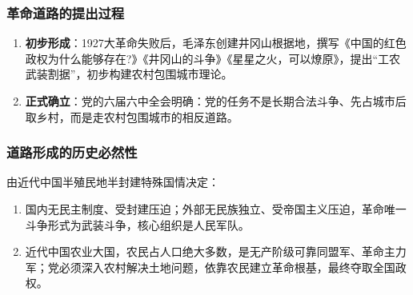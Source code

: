 \subsubsection{革命道路的提出过程}
\begin{enumerate}
    \item \textbf{初步形成}：1927大革命失败后，毛泽东创建井冈山根据地，撰写《中国的红色政权为什么能够存在?》《井冈山的斗争》《星星之火，可以燎原》，提出“工农武装割据”，初步构建农村包围城市理论。
    \item \textbf{正式确立}：党的六届六中全会明确：党的任务不是长期合法斗争、先占城市后取乡村，而是走农村包围城市的相反道路。
\end{enumerate}

\subsubsection{道路形成的历史必然性}
由近代中国半殖民地半封建特殊国情决定：
\begin{enumerate}
    \item 国内无民主制度、受封建压迫；外部无民族独立、受帝国主义压迫，革命唯一斗争形式为武装斗争，核心组织是人民军队。
    \item 近代中国农业大国，农民占人口绝大多数，是无产阶级可靠同盟军、革命主力军；党必须深入农村解决土地问题，依靠农民建立革命根基，最终夺取全国政权。
\end{enumerate}